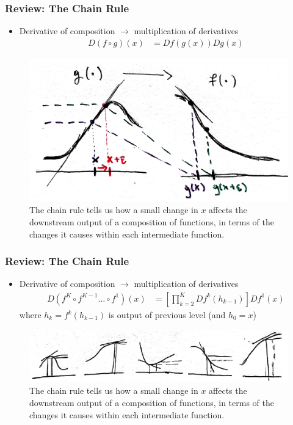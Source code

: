 \documentclass[10pt,mathserif]{beamer}
\begin{document}
\begin{frame}
  \frametitle{Review: The Chain Rule}
  \begin{itemize}
  \item Derivative of composition $\rightarrow$ multiplication of derivatives
    \begin{align*}
      D\left(f \circ g\right)\left(x\right) &= D f\left(g\left(x\right)\right)Dg\left(x\right)
    \end{align*}
  \end{itemize}
 \begin{figure}[ht]
   \centering
   \includegraphics[width=0.75\paperwidth]{figure/chain_rule_2}
   \caption{The chain rule tells us how a small change in $x$ affects the
     downstream output of a composition of functions, in terms of the changes it
     causes within each intermediate function. \label{fig:chain_rule_2} }
 \end{figure}
\end{frame}

\begin{frame}
  \frametitle{Review: The Chain Rule}
  \begin{itemize}
  \item Derivative of composition $\rightarrow$ multiplication of derivatives
    \begin{align*}
      D\left(f^{K} \circ f^{K - 1} \dots \circ f^{1}\right)\left(x\right) &= \left[\prod_{k = 2}^{K} D f^{k}\left(h_{k - 1}\right)\right]D f^1\left(x\right)
    \end{align*}
    where $h_k = f^{k}\left(h_{k - 1}\right)$ is output of previous level (and $h_0 = x$)
  \end{itemize}
  \begin{figure}[ht]
    \centering
    \includegraphics[width=0.8\paperwidth]{figure/chain_rule_k}
    \caption{The chain rule tells us how a small change in $x$ affects the
      downstream output of a composition of functions, in terms of the changes it
      causes within each intermediate function. \label{fig:chain_rule_k} }
  \end{figure}
\end{frame}
\end{document}
